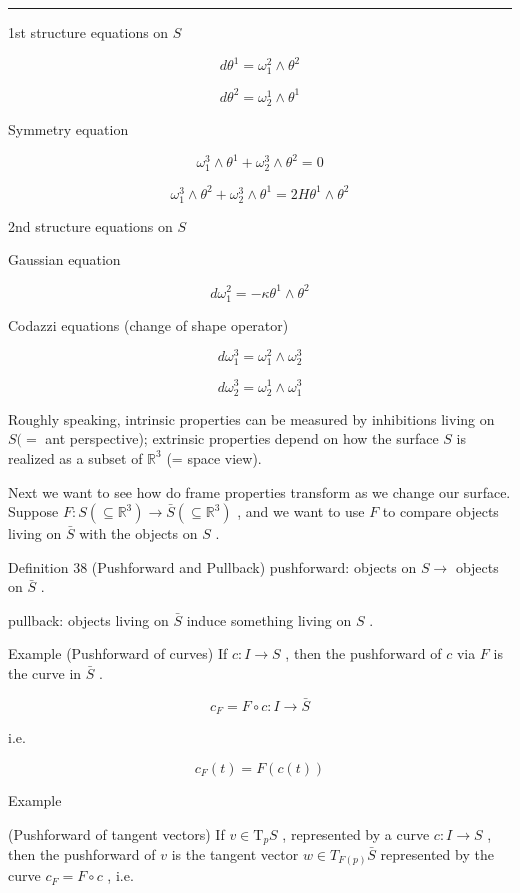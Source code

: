 \documentclass[lang=cn,a4paper,11pt,openany,twoside]{elegantbook}
\newcommand{\HRule}{\begin{center}\rule{0.9\linewidth}{0.2mm}\end{center}}
\begin{document}
\HRule

1st structure equations on \(S\)

\[
d{\theta }^{1} = {\omega }_{1}^{2} \land  {\theta }^{2}
\]

\[
d{\theta }^{2} = {\omega }_{2}^{1} \land  {\theta }^{1}
\]

Symmetry equation

\[
{\omega }_{1}^{3} \land  {\theta }^{1} + {\omega }_{2}^{3} \land  {\theta }^{2} = 0
\]

\[
{\omega }_{1}^{3} \land  {\theta }^{2} + {\omega }_{2}^{3} \land  {\theta }^{1} = {2H}{\theta }^{1} \land  {\theta }^{2}
\]

2nd structure equations on \(S\)

Gaussian equation

\[
d{\omega }_{1}^{2} =  - \kappa {\theta }^{1} \land  {\theta }^{2}
\]

Codazzi equations (change of shape operator)

\[
d{\omega }_{1}^{3} = {\omega }_{1}^{2} \land  {\omega }_{2}^{3}
\]

\[
d{\omega }_{2}^{3} = {\omega }_{2}^{1} \land  {\omega }_{1}^{3}
\]

Roughly speaking, intrinsic properties can be measured by inhibitions living on \(S( =\) ant perspective); extrinsic properties depend on how the surface \(S\) is realized as a subset of \({\mathbb{R}}^{3}\) (= space view).

Next we want to see how do frame properties transform as we change our surface. Suppose \(F : S\left( { \subseteq  {\mathbb{R}}^{3}}\right)  \rightarrow  \bar{S}\left( { \subseteq  {\mathbb{R}}^{3}}\right)\) , and we want to use \(F\) to compare objects living on \(\bar{S}\) with the objects on \(S\) .

Definition 38 (Pushforward and Pullback) pushforward: objects on \(S \rightarrow\) objects on \(\bar{S}\) .

pullback: objects living on \(\bar{S}\) induce something living on \(S\) .

Example (Pushforward of curves) If \(c : I \rightarrow  S\) , then the pushforward of \(c\) via \(F\) is the curve in \(\bar{S}\) .

\[
{c}_{F} = F \circ  c : I \rightarrow  \bar{S}
\]

i.e.

\[
{c}_{F}\left( t\right)  = F\left( {c\left( t\right) }\right)
\]

Example

(Pushforward of tangent vectors) If \(v \in  {\mathrm{T}}_{p}S\) , represented by a curve \(c : I \rightarrow  S\) , then the pushforward of \(v\) is the tangent vector \(w \in  {T}_{F\left( p\right) }\bar{S}\) represented by the curve \({c}_{F} = F \circ  c\) , i.e.
\end{document}
